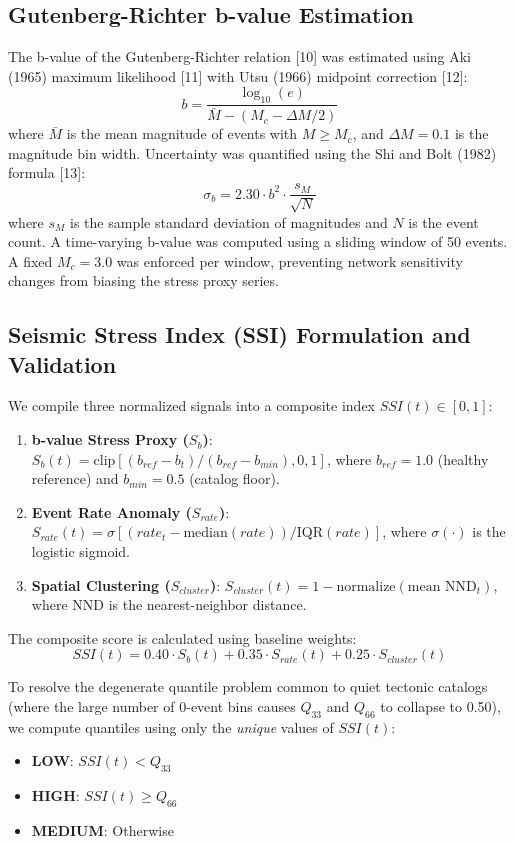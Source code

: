 \documentclass[journal]{IEEEtran}
\begin{document}
\subsection{Gutenberg-Richter b-value Estimation}
The b-value of the Gutenberg-Richter relation [10] was estimated using Aki (1965) maximum likelihood [11] with Utsu (1966) midpoint correction [12]:
\begin{equation}
b = \frac{\log_{10}(e)}{\bar{M} - (M_c - \Delta M/2)}
\end{equation}
where $\bar{M}$ is the mean magnitude of events with $M \ge M_c$, and $\Delta M = 0.1$ is the magnitude bin width. Uncertainty was quantified using the Shi and Bolt (1982) formula [13]:
\begin{equation}
\sigma_b = 2.30 \cdot b^2 \cdot \frac{s_M}{\sqrt{N}}
\end{equation}
where $s_M$ is the sample standard deviation of magnitudes and $N$ is the event count. A time-varying b-value was computed using a sliding window of 50 events. A fixed $M_c = 3.0$ was enforced per window, preventing network sensitivity changes from biasing the stress proxy series.

\subsection{Seismic Stress Index (SSI) Formulation and Validation}
We compile three normalized signals into a composite index $SSI(t) \in [0, 1]$:
\begin{enumerate}
  \item \textbf{b-value Stress Proxy ($S_b$)}: $S_b(t) = \text{clip}[(b_{ref} - b_t) / (b_{ref} - b_{min}), 0, 1]$, where $b_{ref} = 1.0$ (healthy reference) and $b_{min} = 0.5$ (catalog floor).
  \item \textbf{Event Rate Anomaly ($S_{rate}$)}: $S_{rate}(t) = \sigma[(rate_t - \text{median}(rate)) / \text{IQR}(rate)]$, where $\sigma(\cdot)$ is the logistic sigmoid.
  \item \textbf{Spatial Clustering ($S_{cluster}$)}: $S_{cluster}(t) = 1 - \text{normalize}(\text{mean NND}_t)$, where NND is the nearest-neighbor distance.
\end{enumerate}

The composite score is calculated using baseline weights:
\begin{equation}
SSI(t) = 0.40 \cdot S_b(t) + 0.35 \cdot S_{rate}(t) + 0.25 \cdot S_{cluster}(t)
\end{equation}

To resolve the degenerate quantile problem common to quiet tectonic catalogs (where the large number of 0-event bins causes $Q_{33}$ and $Q_{66}$ to collapse to 0.50), we compute quantiles using only the \textit{unique} values of $SSI(t)$:
\begin{itemize}
  \item \textbf{LOW}: $SSI(t) < Q_{33}$
  \item \textbf{HIGH}: $SSI(t) \ge Q_{66}$
  \item \textbf{MEDIUM}: Otherwise
\end{itemize}
\end{document}
